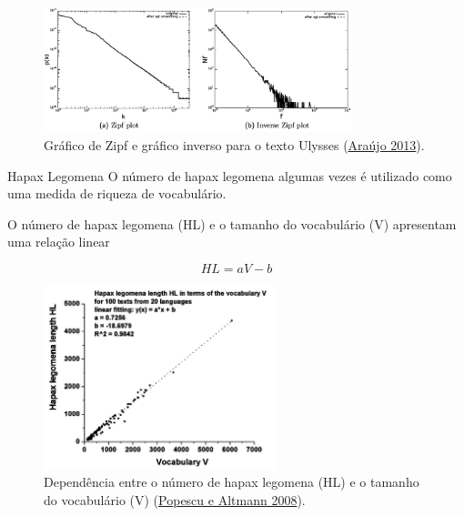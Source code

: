 \documentclass[
  ignorenonframetext,
  aspectratio=169]{beamer}
\begin{document}
\begin{frame}
\begin{figure}
\centering
\includegraphics[width=0.8\textwidth,height=\textheight]{zipf-inverse-2.png}
\caption{Gráfico de Zipf e gráfico inverso para o texto Ulysses
(\protect\hyperlink{ref-leoca2013}{Araújo 2013}).}
\end{figure}
\end{frame}

\begin{frame}{Hapax Legomena}
\protect\hypertarget{hapax-legomena}{}
O número de hapax legomena algumas vezes é utilizado como uma medida de
riqueza de vocabulário.

O número de hapax legomena (HL) e o tamanho do vocabulário (V)
apresentam uma relação linear

\[
HL = aV - b
\]
\end{frame}

\begin{frame}
\begin{figure}
\centering
\includegraphics[width=0.6\textwidth,height=\textheight]{altmann-hapaxlegomena.png}
\caption{Dependência entre o número de hapax legomena (HL) e o tamanho
do vocabulário (V) (\protect\hyperlink{ref-popescu2008}{Popescu e
Altmann 2008}).}
\end{figure}
\end{frame}
\end{document}
